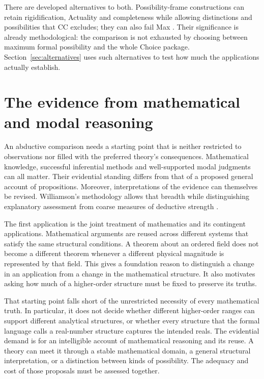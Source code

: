\documentclass[11pt]{article}
\begin{document}
There are developed alternatives to both. Possibility-frame constructions can retain rigidification, Actuality and completeness while allowing distinctions and possibilities that CC excludes; they can also fail Max \citep{modalized}. Their significance is already methodological: the comparison is not exhausted by choosing between maximum formal possibility and the whole Choice package. Section~\ref{sec:alternatives} uses such alternatives to test how much the applications actually establish.

\section{The evidence from mathematical and modal reasoning}\label{sec:evidence}

An abductive comparison needs a starting point that is neither restricted to observations nor filled with the preferred theory's consequences. Mathematical knowledge, successful inferential methods and well-supported modal judgments can all matter. Their evidential standing differs from that of a proposed general account of propositions. Moreover, interpretations of the evidence can themselves be revised. Williamson's methodology allows that breadth while distinguishing explanatory assessment from coarse measures of deductive strength \citep[\S\S13.2--13.3, pp.~334--338]{williamson2017}.

The first application is the joint treatment of mathematics and its contingent applications. Mathematical arguments are reused across different systems that satisfy the same structural conditions. A theorem about an ordered field does not become a different theorem whenever a different physical magnitude is represented by that field. This gives a foundation reason to distinguish a change in an application from a change in the mathematical structure. It also motivates asking how much of a higher-order structure must be fixed to preserve its truths.

That starting point falls short of the unrestricted necessity of every mathematical truth. In particular, it does not decide whether different higher-order ranges can support different analytical structures, or whether every structure that the formal language calls a real-number structure captures the intended reals. The evidential demand is for an intelligible account of mathematical reasoning and its reuse. A theory can meet it through a stable mathematical domain, a general structural interpretation, or a distinction between kinds of possibility. The adequacy and cost of those proposals must be assessed together.
\end{document}
